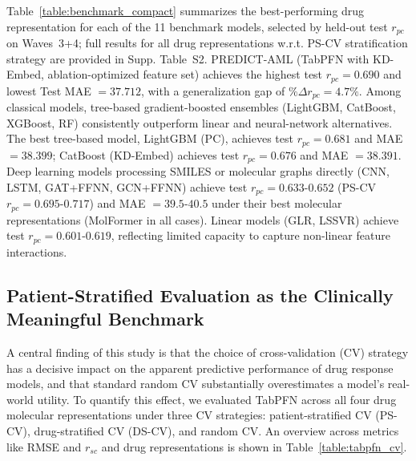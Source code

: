 \documentclass[pdflatex,sn-mathphys-num]{sn-jnl}
\theoremstyle{thmstyleone}
\theoremstyle{thmstyletwo}
\theoremstyle{thmstylethree}
\begin{document}
Table~\ref{table:benchmark_compact} summarizes the best-performing drug representation for each of the 11 benchmark models, selected by held-out test $r_{pc}$ on Waves~3+4; full results for all drug representations w.r.t. PS-CV stratification strategy are provided in Supp. Table~S2. PREDICT-AML (TabPFN with KD-Embed, ablation-optimized feature set) achieves the highest test $r_{pc} = 0.690$ and lowest Test MAE $= 37.712$, with a generalization gap of $\%\Delta r_{pc} = 4.7\%$. Among classical models, tree-based gradient-boosted ensembles (LightGBM, CatBoost, XGBoost, RF) consistently outperform linear and neural-network alternatives. The best tree-based model, LightGBM (PC), achieves test $r_{pc} = 0.681$ and MAE $= 38.399$; CatBoost (KD-Embed) achieves test $r_{pc} = 0.676$ and MAE $= 38.391$. Deep learning models processing SMILES or molecular graphs directly (CNN, LSTM, GAT+FFNN, GCN+FFNN) achieve test $r_{pc} = 0.633$-$0.652$ (PS-CV $r_{pc} = 0.695$-$0.717$) and MAE $= 39.5$-$40.5$ under their best molecular representations (MolFormer in all cases). Linear models (GLR, LSSVR) achieve test $r_{pc} = 0.601$-$0.619$, reflecting limited capacity to capture non-linear feature interactions. %

\subsection{Patient-Stratified Evaluation as the Clinically Meaningful Benchmark}\label{sec3.2}
A central finding of this study is that the choice of cross-validation (CV) strategy has a decisive impact on the apparent predictive performance of drug response models, and that standard random CV substantially overestimates a model's real-world utility. To quantify this effect, we evaluated TabPFN across all four drug molecular representations under three CV strategies: patient-stratified CV (PS-CV), drug-stratified CV (DS-CV), and random CV. An overview across metrics like RMSE and $r_{sc}$ and drug representations is shown in Table~\ref{table:tabpfn_cv}.
\end{document}
